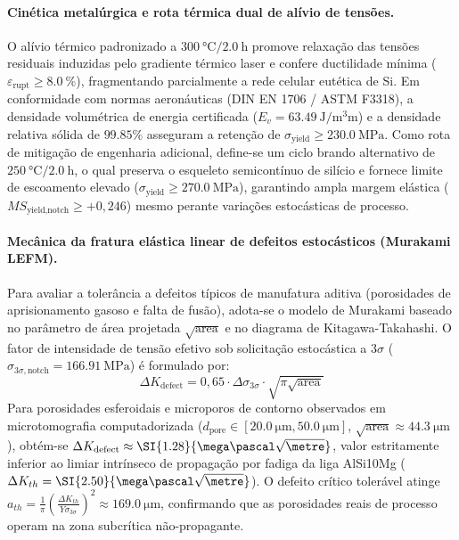 \paragraph*{Cinética metalúrgica e rota térmica dual de alívio de tensões.}
O alívio térmico padronizado a $\SI{300}{\celsius} / \SI{2.0}{\hour}$ promove relaxação das tensões residuais induzidas pelo gradiente térmico laser e confere ductilidade mínima ($\varepsilon_{\text{rupt}} \ge \SI{8.0}{\percent}$), fragmentando parcialmente a rede celular eutética de Si. Em conformidade com normas aeronáuticas (DIN EN 1706 / ASTM F3318), a densidade volumétrica de energia certificada ($E_v = \SI{63.49}{\joule\per\cubic\milli\metre}$) e a densidade relativa sólida de $\num{99.85}\%$ asseguram a retenção de $\sigma_{\text{yield}} \ge \SI{230.0}{\mega\pascal}$. Como rota de mitigação de engenharia adicional, define-se um ciclo brando alternativo de $\SI{250}{\celsius} / \SI{2.0}{\hour}$, o qual preserva o esqueleto semicontínuo de silício e fornece limite de escoamento elevado ($\sigma_{\text{yield}} \ge \SI{270.0}{\mega\pascal}$), garantindo ampla margem elástica ($MS_{\text{yield,notch}} \ge +0{,}246$) mesmo perante variações estocásticas de processo.

\paragraph*{Mecânica da fratura elástica linear de defeitos estocásticos (Murakami LEFM).}
Para avaliar a tolerância a defeitos típicos de manufatura aditiva (porosidades de aprisionamento gasoso e falta de fusão), adota-se o modelo de Murakami baseado no parâmetro de área projetada $\sqrt{\text{area}}$ e no diagrama de Kitagawa-Takahashi. O fator de intensidade de tensão efetivo sob solicitação estocástica a $3\sigma$ ($\sigma_{3\sigma,\text{notch}} = \SI{166.91}{\mega\pascal}$) é formulado por:
\begin{equation}
  \Delta K_{\text{defect}} = 0{,}65 \cdot \Delta \sigma_{3\sigma} \cdot \sqrt{\pi \sqrt{\text{area}}}
  \label{eq:murakami-rev}
\end{equation}
Para porosidades esferoidais e microporos de contorno observados em microtomografia computadorizada ($d_{\text{pore}} \in [\SI{20.0}{\micro\metre}, \SI{50.0}{\micro\metre}]$, $\sqrt{\text{area}} \approx \SI{44.3}{\micro\metre}$), obtém-se $\Delta K_{\text{defect}} \approx \SI{1.28}{\mega\pascal\sqrt{\metre}}$, valor estritamente inferior ao limiar intrínseco de propagação por fadiga da liga AlSi10Mg ($\Delta K_{th} = \SI{2.50}{\mega\pascal\sqrt{\metre}}$). O defeito crítico tolerável atinge $a_{th} = \frac{1}{\pi}\left(\frac{\Delta K_{th}}{Y \sigma_{3\sigma}}\right)^2 \approx \SI{169.0}{\micro\metre}$, confirmando que as porosidades reais de processo operam na zona subcrítica não-propagante.

